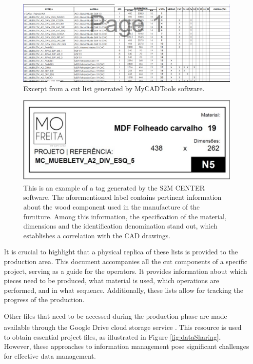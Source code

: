 \begin{figure}[ht!]
    \centering
    \includegraphics[width=.65\linewidth]{images/Development/chap4/ListaDeCorte.png}
    \caption{Excerpt from a cut list generated by MyCADTools software.}
    \label{fig:cutLsitMyCad}
\end{figure}

\begin{figure}[ht!]
    \centering
    \includegraphics[width=.65\linewidth]{images/Development/chap4/tagExample.png} 
    \caption{This is an example of a tag generated by the S2M CENTER\textsuperscript{\textregistered} software. The aforementioned label contains pertinent information about the wood component used in the manufacture of the furniture. Among this information, the specification of the material, dimensions and the identification denomination stand out, which establishes a correlation with the CAD drawings.}
    \label{fig:tagExample}
\end{figure}

It is crucial to highlight that a physical replica of these lists is provided to the production area. This document accompanies all the cut components of a specific project, serving as a guide for the operators. It provides information about which pieces need to be produced, what material is used, which operations are performed, and in what sequence. Additionally, these lists allow for tracking the progress of the production.

Other files that need to be accessed during the production phase are made available through the Google Drive\textsuperscript{\textregistered} cloud storage service \cite{google-drive2023}. This resource is used to obtain essential project files, as illustrated in Figure \ref{fig:dataSharing}. However, these approaches to information management pose significant challenges for effective data management.

